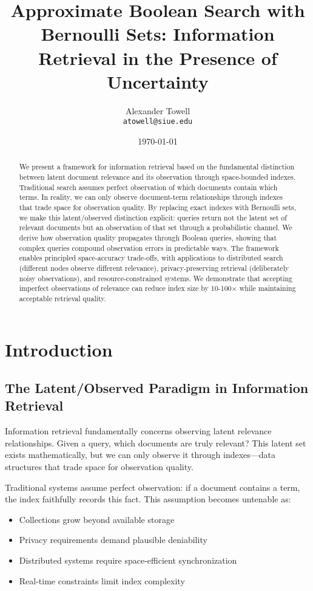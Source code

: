 \documentclass[11pt,final,hidelinks]{article}
\title{Approximate Boolean Search with Bernoulli Sets: Information Retrieval in the Presence of Uncertainty}
\author{
    Alexander Towell\\
    \texttt{atowell@siue.edu}
}
\date{\today}
\begin{document}
\maketitle
\NotationSection

\begin{abstract}
We present a framework for information retrieval based on the fundamental distinction between latent document relevance and its observation through space-bounded indexes. Traditional search assumes perfect observation of which documents contain which terms. In reality, we can only observe document-term relationships through indexes that trade space for observation quality. By replacing exact indexes with Bernoulli sets, we make this latent/observed distinction explicit: queries return not the latent set of relevant documents but an observation of that set through a probabilistic channel. We derive how observation quality propagates through Boolean queries, showing that complex queries compound observation errors in predictable ways. The framework enables principled space-accuracy trade-offs, with applications to distributed search (different nodes observe different relevance), privacy-preserving retrieval (deliberately noisy observations), and resource-constrained systems. We demonstrate that accepting imperfect observations of relevance can reduce index size by 10-100× while maintaining acceptable retrieval quality.
\end{abstract}

\section{Introduction}

\subsection{The Latent/Observed Paradigm in Information Retrieval}

Information retrieval fundamentally concerns observing latent relevance relationships. Given a query, which documents are truly relevant? This latent set exists mathematically, but we can only observe it through indexes—data structures that trade space for observation quality.

Traditional systems assume perfect observation: if a document contains a term, the index faithfully records this fact. This assumption becomes untenable as:
\begin{itemize}
    \item Collections grow beyond available storage
    \item Privacy requirements demand plausible deniability
    \item Distributed systems require space-efficient synchronization
    \item Real-time constraints limit index complexity
\end{itemize}
\end{document}
